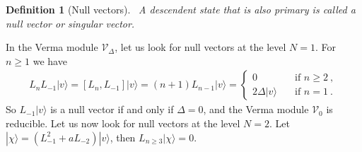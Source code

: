 \documentclass[12pt, a4paper]{article}
\theoremstyle{break}
\newtheorem{defn}[exo]{Definition}
\begin{document}
\begin{defn}[Null vectors]
 ~\label{def:nv}
 A descendent state that is also primary is called a null vector or singular vector.
\end{defn}
In the Verma module $\mathcal V_\Delta$, let us look for null vectors at the level $N=1$. For $n\geq 1$ we have 
\begin{align}
L_n L_{-1}|v\rangle = [L_n, L_{-1}] |v\rangle = (n+1) L_{n-1}|v\rangle = 
\left\{\begin{array}{ll} 0 &  \quad \text{if } n\geq 2\ , \\ 2\Delta |v\rangle & \quad \text{if } n = 1\ . \end{array}\right. 
\end{align}
So $L_{-1}|v\rangle$ is a null vector if and only if $\Delta=0$, and the Verma module $\mathcal V_0$ is reducible.
Let us now look for null vectors at the level $N=2$. Let $|\chi\rangle = (L_{-1}^2 + a L_{-2})|v\rangle$, then $L_{n\geq 3} |\chi \rangle =0$. 
\end{document}

